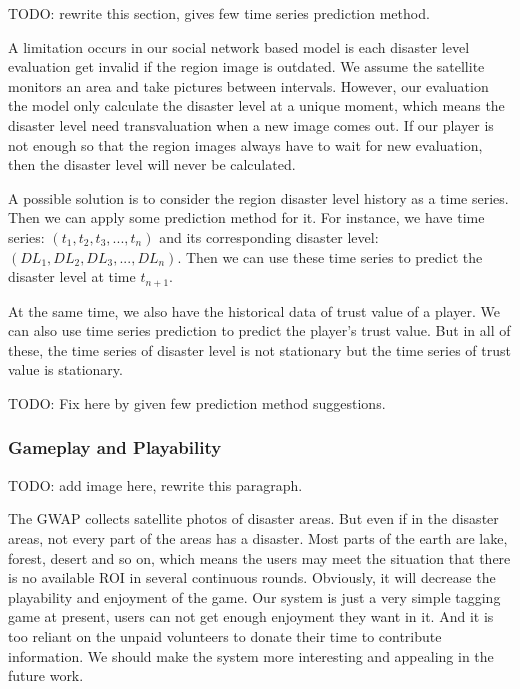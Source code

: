 TODO: rewrite this section, gives few time series prediction method.

A limitation occurs in our social network based model is each disaster level evaluation get invalid 
if the region image is outdated. 
We assume the satellite monitors an area and take pictures between intervals. However, our evaluation
the model only calculate the disaster level at a unique moment, which means the disaster level need 
transvaluation when a new image comes out.
If our player is not enough so that the region images always have to wait for new evaluation, then the
disaster level will never be calculated.

A possible solution is to consider the region disaster level history as a time series. Then we can apply
some prediction method for it. For instance, we have time series: $(t_1, t_2, t_3, ..., t_n)$
and its corresponding disaster level: $(DL_1, DL_2, DL_3, ..., DL_n)$.
Then we can use these time series to predict the disaster level at time $t_{n+1}$.

At the same time, we also have the historical data of trust value of a player. We can also
use time series prediction to predict the player's trust value. But in all of these, the time series
of disaster level is not stationary but the time series of trust value is stationary.

TODO: Fix here by given few prediction method suggestions.

\subsubsection{Gameplay and Playability}

TODO: add image here, rewrite this paragraph.

The GWAP collects satellite photos of disaster areas. But even if in the disaster areas, 
not every part of the areas has a disaster. Most parts of the earth are lake, forest, 
desert and so on, which means the users may meet the situation that there is no available 
ROI in several continuous rounds. Obviously, it will decrease the playability and enjoyment of the game.
Our system is just a very simple tagging game at present, users can not get enough enjoyment they want in it. 
And it is too reliant on the unpaid volunteers to donate their time to contribute information. 
We should make the system more interesting and appealing in the future work.